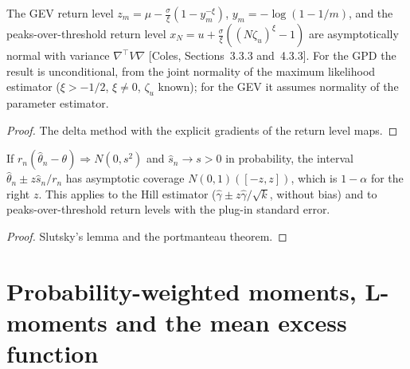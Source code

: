 \begin{theorem}
  \label{thm:return-level-normality}
  \leanok
  The GEV return level $z_m = \mu - \frac{\sigma}{\xi}(1 - y_m^{-\xi})$, $y_m = -\log(1 - 1/m)$, and the peaks-over-threshold
  return level $x_N = u + \frac{\sigma}{\xi}((N\zeta_u)^\xi - 1)$ are asymptotically normal with variance $\nabla^\top V \nabla$ [Coles,
  Sections~3.3.3 and~4.3.3]. For the GPD the result is unconditional, from the joint normality of the maximum likelihood
  estimator ($\xi > -1/2$, $\xi \ne 0$, $\zeta_u$ known); for the GEV it assumes normality of the parameter estimator.
\end{theorem}
\begin{proof}
  \leanok
  The delta method with the explicit gradients of the return level maps.
\end{proof}

\begin{theorem}
  \label{thm:wald-intervals}
  \leanok
  If $r_n(\hat\theta_n - \theta) \Rightarrow N(0, s^2)$ and $\hat s_n \to s > 0$ in probability, the interval
  $\hat\theta_n \pm z\hat s_n/r_n$ has asymptotic coverage $N(0,1)([-z, z])$, which is $1 - \alpha$ for the right $z$. This applies
  to the Hill estimator ($\hat\gamma \pm z\hat\gamma/\sqrt k$, without bias) and to peaks-over-threshold return levels with
  the plug-in standard error.
\end{theorem}
\begin{proof}
  \leanok
  Slutsky's lemma and the portmanteau theorem.
\end{proof}

\section{Probability-weighted moments, L-moments and the mean excess function}

